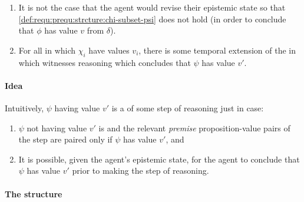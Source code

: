 \begin{definition}
\begin{enumerate}[label=\arabic*., ref=\named{P\(\Re\):\arabic*}]
\begin{enumerate}[label=\alph*., ref=\named{P\(\Re\):1\alph*}]
    \end{enumerate}
  \item
    \label{def:requ:prequ:no-revision}
    It is not the case that the agent would revise their epistemic state so that \ref{def:requ:prequ:strcture:chi-subset-psi} does not hold (in order to conclude that \(\phi\) has value \(v\) from \(\delta\)).
  \item
    \label{def:requ:prequ:possible-reason}
    For all \epVW{} in which \(\chi_{i}\) have values \(v_{i}\), there is some temporal extension of the \world{} in which \vAgent{} witnesses reasoning which concludes that \(\psi\) has value \(v'\).
  \end{enumerate}
\end{definition}



\paragraph{Idea}

\begin{note}
  Intuitively, \(\psi\) having value \(v'\) is a \prequ{} of some step of reasoning just in case:
  \begin{enumerate}[label=\arabic*., ref=(\arabic*)]
  \item
    \label{prequ:int:structure}
    \(\psi\) not having value \(v'\) is \epVAd{} and the relevant \emph{premise} proposition-value pairs of the step are paired only if \(\psi\) has value \(v'\), and
  \item
    \label{prequ:int:reasoning}
    It is possible, given the agent's epistemic state, for the agent to conclude that \(\psi\) has value \(v'\) prior to making the step of reasoning.
  \end{enumerate}
\end{note}

\paragraph{The structure}

